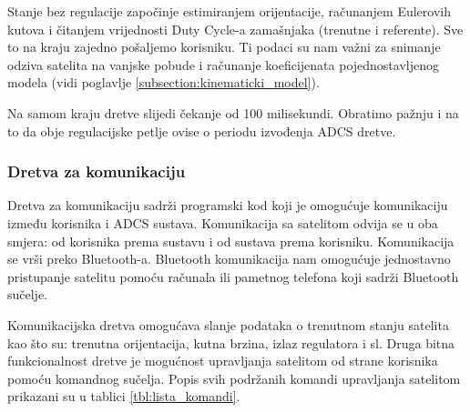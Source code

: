 \documentclass[times, utf8, diplomski, numeric]{templates/template}
\begin{document}
{{{{                Stanje bez regulacije započinje estimiranjem orijentacije, računanjem Eulerovih kutova i čitanjem vrijednosti Duty Cycle-a zamašnjaka (trenutne i referente). Sve to na kraju zajedno pošaljemo korisniku. Ti podaci su nam važni za snimanje odziva satelita na vanjske pobude i računanje koeficijenata pojednostavljenog modela (vidi poglavlje \ref{subsection:kinematicki_model}).

                Na samom kraju dretve slijedi čekanje od 100 milisekundi. Obratimo pažnju i na to da obje regulacijske petlje ovise o periodu izvođenja ADCS dretve.
            }

            \subsubsection{Dretva za komunikaciju}{
                Dretva za komunikaciju sadrži programski kod koji je omogućuje komunikaciju između korisnika i ADCS sustava. Komunikacija sa satelitom odvija se u oba smjera: od korisnika prema sustavu i od sustava prema korisniku. Komunikacija se vrši preko Bluetooth-a. Bluetooth komunikacija nam omogućuje jednostavno pristupanje satelitu pomoću računala ili  pametnog telefona koji sadrži Bluetooth sučelje.

                Komunikacijska dretva omogućava slanje podataka o trenutnom stanju satelita kao što su: trenutna orijentacija, kutna brzina, izlaz regulatora i sl. Druga bitna funkcionalnost dretve je mogućnost upravljanja satelitom od strane korisnika pomoću komandnog sučelja. Popis svih podržanih komandi upravljanja satelitom prikazani su u tablici \ref{tbl:lista_komandi}.

}}}}
\end{document}
